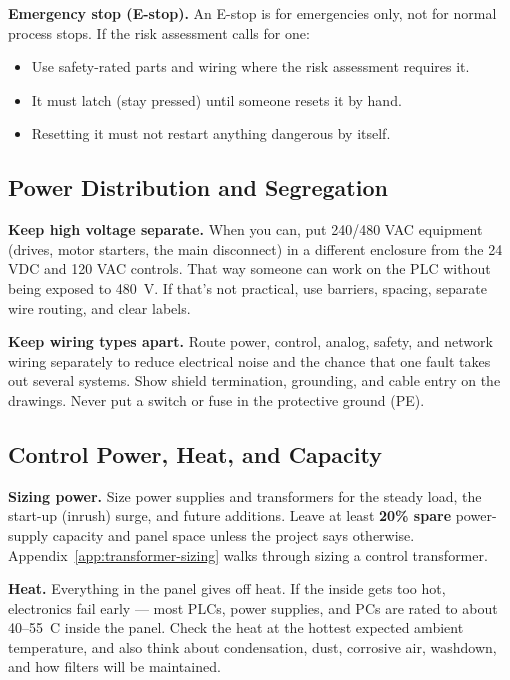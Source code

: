 \textbf{Emergency stop (E-stop).} An E-stop is for emergencies only, not for normal process stops. If the risk assessment calls for one:
\begin{itemize}[itemsep=1pt]
  \item Use safety-rated parts and wiring where the risk assessment requires it.
  \item It must latch (stay pressed) until someone resets it by hand.
  \item Resetting it must not restart anything dangerous by itself.
\end{itemize}

\subsection{Power Distribution and Segregation}
\textbf{Keep high voltage separate.} When you can, put 240/480 VAC equipment (drives, motor starters, the main disconnect) in a different enclosure from the 24 VDC and 120 VAC controls. That way someone can work on the PLC without being exposed to 480~V. If that's not practical, use barriers, spacing, separate wire routing, and clear labels.

\textbf{Keep wiring types apart.} Route power, control, analog, safety, and network wiring separately to reduce electrical noise and the chance that one fault takes out several systems. Show shield termination, grounding, and cable entry on the drawings. Never put a switch or fuse in the protective ground (PE).

\subsection{Control Power, Heat, and Capacity}\label{sec:heat}
\textbf{Sizing power.} Size power supplies and transformers for the steady load, the start-up (inrush) surge, and future additions. Leave at least \textbf{20\% spare} power-supply capacity and panel space unless the project says otherwise. Appendix~\ref{app:transformer-sizing} walks through sizing a control transformer.

\textbf{Heat.} Everything in the panel gives off heat. If the inside gets too hot, electronics fail early --- most PLCs, power supplies, and PCs are rated to about 40--55~\textdegree C inside the panel. Check the heat at the hottest expected ambient temperature, and also think about condensation, dust, corrosive air, washdown, and how filters will be maintained.

